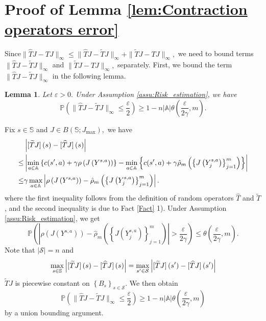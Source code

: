 \documentclass[12pt,technote,onecolumn]{IEEEtran}
\newtheorem{lemma}{Lemma}
\begin{document}
\section*{Proof of Lemma \ref{lem:Contraction operators error}}
\begin{IEEEproof}
	Since$\|\widehat{T}J-TJ\|_{\infty}\leq\|\widehat{T}J-\widetilde{T}J\|_{\infty}+\|\widetilde{T}J-TJ\|_{\infty},$
	we need to bound terms $\|\widehat{T}J-\widetilde{T}J\|_{\infty}$
	and $\|\widetilde{T}J-TJ\|_{\infty},$ separately. First, we bound
	the term $\|\widehat{T}J-\widetilde{T}J\|_{\infty}$ in the following
	lemma.
	\begin{lemma}\label{lem5-1}
		Let $\varepsilon>0.$ Under Assumption \ref{assu:Risk_estimation}, we have
		\[
		\mathbb{P}\left(\|\widehat{T}J-\widetilde{T}J\|_{\infty}\leq\frac{\varepsilon}{2}\right)\geq1-n\left|\mathbb{A}\right|\theta\left(\frac{\varepsilon}{2\gamma},m\right).
		\]
	\end{lemma}
	\begin{IEEEproof}
		Fix $s\in\mathbb{S}$ and $J\in  B\left(\mathbb{S};J_{\max}\right),$
		we have
		\begin{equation*}
		\begin{aligned}
		&\left|[\widetilde{T}J]\left(s\right)-[\text{\ensuremath{\widehat{T}}}J]\left(s\right)\right|\\
		\leq &\left|\min_{a\in\mathbb{A}}\left\{ c(s',a)+\gamma\rho\left(J\left(Y^{s,a}\right)\right)\right\}-\min_{a\in\mathbb{A}}\left\{ c(s',a)+\gamma\hat{\rho}_{m}\left(\left\{J\left(Y_j^{s,a}\right)\right\}^m_{j=1}\right)\right\}\right|\\
		\leq & \gamma\max_{a\in\mathbb{A}}\left|\rho\left(J\left(Y^{s,a}\right)\right)-\hat{\rho}_{m}\left(\left\{J\left(Y_j^{s,a}\right)\right\}^m_{j=1}\right)\right|.
		\end{aligned}
		\end{equation*}
		where the first inequality follows from the definition of random operators
		$\widehat{T}$ and $\widetilde{T}$, and the second inequality is due
		to Fact \ref{Fact} 1). Under Assumption \ref{assu:Risk_estimation},
		we get
		\[
		\mathbb{P}\left(\left|\rho\left(J\left(Y^{s,a}\right)\right)-\hat{\rho}_{m}\left(\left\{J\left(Y_j^{s,a}\right)\right\}^m_{j=1}\right)\right|>\frac{\varepsilon}{2\gamma}\right)\leq\theta\left(\frac{\varepsilon}{2\gamma},m\right).
		\]
		Note that $|\mathcal{S}|=n$ and $$\max_{s\in\mathbb{S}}\left|[\widetilde{T}J]\left(s\right)-[\text{\ensuremath{\widehat{T}}}J]\left(s\right)\right|=\max_{s'\in\mathcal{S}}\left|[\widetilde{T}J]\left(s'\right)-[\text{\ensuremath{\widehat{T}}}J]\left(s'\right)\right|$$
		$\widetilde{T}J$
		is piecewise constant on $\left\{ B_{s}\right\} _{s\in\mathcal{S}}.$ We then obtain 
		\[
		\mathbb{P}\left(\|\widehat{T}J-\widetilde{T}J\|_{\infty}\leq\frac{\varepsilon}{2}\right)\geq1-n\left|\mathbb{A}\right|\theta\left(\frac{\varepsilon}{2\gamma},m\right)
		\]
		by a union bounding argument.
	\end{IEEEproof}
	

\end{IEEEproof}
\end{document}
